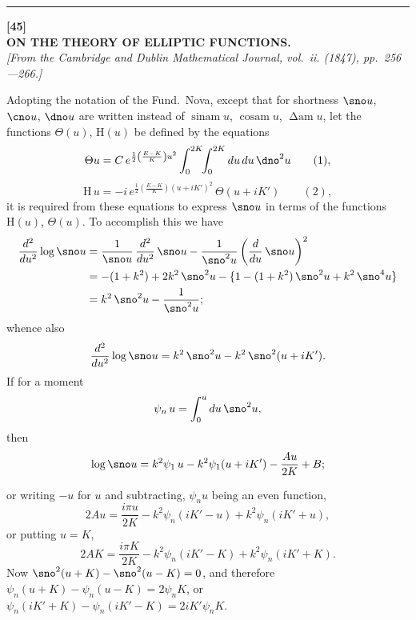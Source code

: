 \documentclass[11pt,a4paper]{book}
\begin{document}
\vspace{20pt}
\begin{center}
\rule{0.5\textwidth}{0.4pt}
\end{center}


\newpage
\begin{center}
\textbf{[45]}\\[4pt]
\textbf{\large ON THE THEORY OF ELLIPTIC FUNCTIONS.}\\[4pt]
\textit{[From the Cambridge and Dublin Mathematical Journal, vol.~ii. (1847), pp.~256---266.]}
\end{center}

\vspace{6pt}

Adopting the notation of the Fund.\ Nova, except that for shortness $\sno u$, $\cno u$, $\dno u$ are written instead of $\operatorname{sinam} u$, $\operatorname{cosam} u$, $\operatorname{\Delta am} u$, let the functions $\Theta(u)$, $\mathrm{H}(u)$ be defined by the equations
\[
\Theta u = C \, e^{\frac{1}{2}\left(\frac{E-K}{K}\right)u^2} \int_0^{2K} \!\!\int_0^{2K} du\,du \, \dno^2 u \qquad(1),
\]
\[
\mathrm{H}\,u = -i\,e^{\frac{1}{2}\left(\frac{E-K}{K}\right)(u+iK')^2} \, \Theta(u+iK') \qquad(2),
\]
it is required from these equations to express $\sno u$ in terms of the functions $\mathrm{H}(u)$, $\Theta(u)$. To accomplish this we have
\begin{align*}
\frac{d^2}{du^2} \log \sno u &= \frac{1}{\sno u}\,\frac{d^2}{du^2}\,\sno u - \frac{1}{\sno^2 u}\left(\frac{d}{du}\,\sno u\right)^2 \\
&= -(1+k^2) + 2k^2\,\sno^2 u - \{1 - (1+k^2)\,\sno^2 u + k^2\,\sno^4 u\} \\
&= k^2\,\sno^2 u - \frac{1}{\sno^2 u};
\end{align*}
whence also
\[
\frac{d^2}{du^2} \log \sno u = k^2\,\sno^2 u - k^2\,\sno^2(u+iK').
\]
If for a moment
\[
\psi_n\,u = \int_0^u du\,\sno^2 u,
\]
then
\[
\log \sno u = k^2\psi_1\,u - k^2\psi_1(u+iK') - \frac{Au}{2K} + B;
\]

\newpage
or writing $-u$ for $u$ and subtracting, $\psi_n u$ being an even function,
\[
2Au = \frac{i\pi u}{2K} - k^2\psi_n(iK'-u) + k^2\psi_n(iK'+u),
\]
or putting $u = K$,
\[
2AK = \frac{i\pi K}{2K} - k^2\psi_n(iK'-K) + k^2\psi_n(iK'+K).
\]
Now $\sno^2(u+K) - \sno^2(u-K) = 0$,
and therefore $\psi_n(u+K) - \psi_n(u-K) = 2\psi_n K$,
or $\psi_n(iK'+K) - \psi_n(iK'-K) = 2iK'\psi_n K$.
\end{document}
